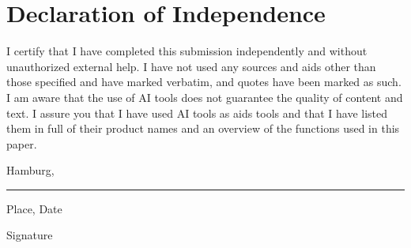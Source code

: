\section*{Declaration of Independence}

I certify that I have completed this submission independently and without unauthorized external help. I have not used any sources and aids other than those specified and have marked verbatim, and quotes have been marked as such. I am aware that the use of AI tools does not guarantee the quality of content and text. I assure you that I have used AI tools as aids tools and that I have listed them in full of their product names and an overview of the functions used in this paper.\\

\begin{minipage}[H]{0.49\textwidth}
	Hamburg, \dateofsubmission
\end{minipage}
\begin{minipage}[H]{0.49\textwidth}
	
\end{minipage}

\hrule
\vspace{3mm}

\begin{minipage}[H]{0.49\textwidth}
	Place, Date
\end{minipage}
\begin{minipage}[H]{0.49\textwidth}
	Signature
\end{minipage}